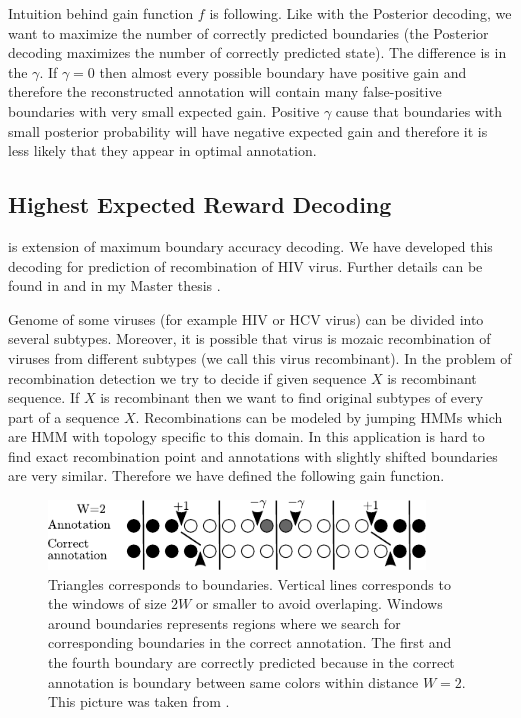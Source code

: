 Intuition behind gain function $f$ is following. Like with the Posterior
decoding, we want to maximize the number of correctly predicted boundaries (the
Posterior decoding maximizes the number of correctly predicted state). The
difference is in the $\gamma$. If $\gamma=0$ then almost every possible boundary
have positive gain and therefore the reconstructed annotation will contain many
false-positive boundaries with very small expected gain. Positive $\gamma$ cause
that boundaries with small posterior probability will have negative expected
gain and therefore it is less likely that they appear in optimal annotation.


\subsection{Highest Expected Reward Decoding}

 is extension of maximum
boundary accuracy decoding. We have developed this decoding for prediction of
recombination of HIV virus.  Further details can be found in \cite{Nanasi2010}
and in my Master thesis \cite{Nanasi2010mgr}.


Genome of some viruses (for example HIV or HCV virus) can be divided into
several subtypes. Moreover, it is possible that virus is mozaic
recombination of viruses from different subtypes (we call this virus
recombinant). In the problem of recombination detection we try to decide if
given sequence $X$ is recombinant sequence. If $X$ is recombinant then we want to find
original subtypes of every part of a sequence $X$. Recombinations can be modeled
by jumping HMMs \cite{Schultz2006} which are HMM with topology specific to this domain.
In this application is 
hard to find exact recombination point and annotations with slightly shifted
boundaries are very similar. Therefore we have defined the following gain
function.

\begin{figure}
\begin{center}
\includegraphics[width=10cm]{../figures/HERDbuddy.pdf}
\end{center}
\caption[Highest Expected Reward Decoding explanation]{
Triangles corresponds to boundaries. Vertical lines corresponds to the windows
of size $2W$ or smaller to avoid overlaping. Windows around boundaries
represents regions where we search for corresponding boundaries in the correct
annotation.
The first and the fourth boundary are correctly predicted because in the correct
annotation is boundary between same colors within distance $W=2$.
This picture was taken from \cite{Nanasi2010mgr}.
}\label{FIGURE:HERDBUDDY}
\end{figure}


